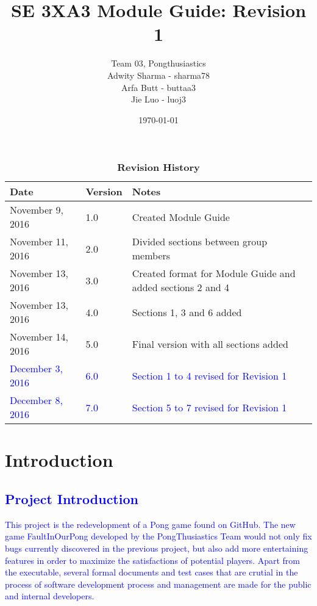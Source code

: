 \documentclass[12pt,letterpaper]{article}
\title{SE 3XA3 Module Guide: Revision 1}
\author{Team 03, Pongthusiastics 		
\\ Adwity Sharma - sharma78 		
\\ Arfa Butt - buttaa3 	
	\\ Jie Luo - luoj3 }
\date{\today}
\begin{document}
\maketitle
\newpage
\tableofcontents
\listoftables
\listoffigures
\begin{table}[h]
\caption{\bf Revision History}
\begin{tabularx}{\textwidth}{p{3.5cm}p{2cm}X}
\toprule {\bf Date} & {\bf Version} & {\bf Notes}\\
\midrule
November 9, 2016 & 1.0 & Created Module Guide \\
November 11, 2016 & 2.0 & Divided sections between group members \\
November 13, 2016 & 3.0 & Created format for Module Guide and added sections 2 and 4 \\
November 13, 2016 & 4.0 & Sections 1, 3 and 6 added \\
November 14, 2016 & 5.0 & Final version with all sections added\\
\textcolor{blue}{December 3, 2016} & \textcolor{blue}{6.0} & \textcolor{blue}{Section 1 to 4 revised for Revision 1}\\
\textcolor{blue}{December 8, 2016} & \textcolor{blue}{7.0} & \textcolor{blue}{Section 5 to 7 revised for Revision 1}\\
\bottomrule
\end{tabularx}
\end{table}
\clearpage
	
	\section{Introduction} \label{intro}
	\subsection{\textcolor{blue}{Project Introduction}}
	\textcolor{blue}{This project is the redevelopment of a Pong game found on GitHub. The new game FaultInOurPong developed by the PongThusiastics Team would not only fix bugs currently discovered in the previous project, but also add more entertaining features in order to maximize the satisfactions of potential players. Apart from the executable, several formal documents and test cases that are crutial in the process of software development process and management are made for the public and internal developers.}\\
\end{document}
